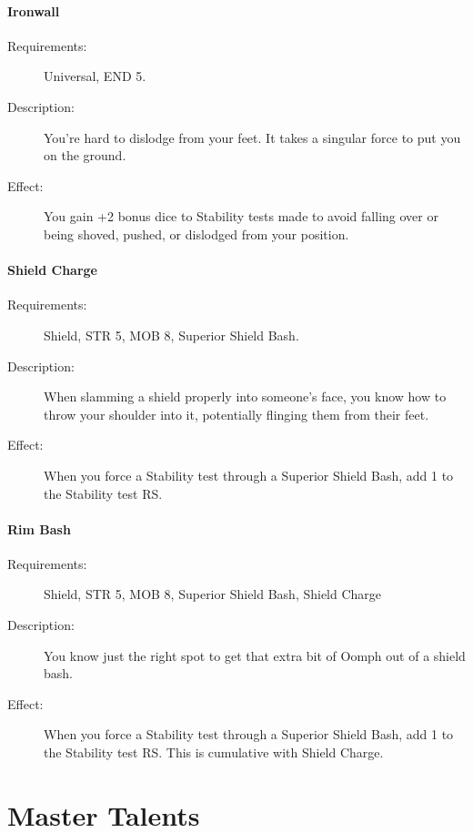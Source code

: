 \documentclass[oneside,11pt,english]{book}
\begin{document}
\paragraph{\label{talent:Ironwall}Ironwall}
\begin{description}
	\item [Requirements:] Universal, END 5. 
	\item [Description:] You’re hard to dislodge from your feet. It takes a singular force to put you on the ground.
	\item [Effect:] You gain +2 bonus dice to Stability tests made to avoid falling over or being shoved, pushed, or dislodged from your position. 
	
\end{description}
\paragraph{\label{talent:Shield Charge}Shield Charge}
\begin{description}
	\item [Requirements:] Shield, STR 5, MOB 8, Superior Shield Bash. 
	\item [Description:] When slamming a shield properly into someone’s face, you know how to throw your shoulder into it, potentially flinging them from their feet. 
	\item [Effect:] When you force a Stability test through a Superior Shield Bash, add 1 to the Stability test RS. 
	
\end{description}
\paragraph{\label{talent:Rim Bash}Rim Bash}
\begin{description}
	\item [Requirements:] Shield, STR 5, MOB 8, Superior Shield Bash, Shield Charge 
	\item [Description:] You know just the right spot to get that extra bit of Oomph out of a shield bash. 
	\item [Effect:] When you force a Stability test through a Superior Shield Bash, add 1 to the Stability test RS. 
	This is cumulative with Shield Charge. 
\end{description}
\section{Master Talents}\label{sec:Master Talents}
\end{document}
